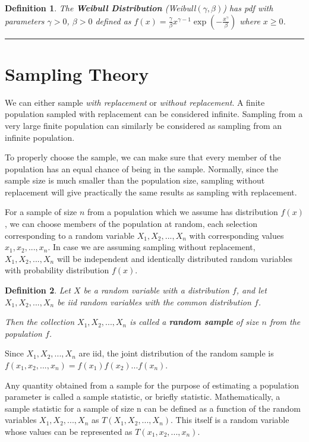 \documentclass[14pt,twoside]{extreport}
\newcommand{\hhrule}{\vspace{1cm}\hrule\vspace{1cm}}
\theoremstyle{dotless}
\newtheorem*{defn}{Definition}
\begin{document}
\begin{defn}
    The \textbf{Weibull Distribution} (Weibull$(\gamma, \beta)$) has pdf with parameters $\gamma > 0$, $\beta > 0$ defined as  $f(x) = \frac{\gamma}{\beta} x^{\gamma - 1} \exp(- \frac{x^\gamma}{\beta})$ where $x \geq 0$.
\end{defn}

\hhrule

\section*{Sampling Theory}
We can either sample \textit{with replacement} or \textit{without replacement}. A finite population sampled with replacement can be considered infinite. Sampling from a very large finite population can similarly be considered as sampling from an infinite population. 

To properly choose the sample, we can make sure that every member of the population has an equal chance of being in the sample.
Normally, since the sample size is much smaller than the population size, sampling without replacement will give practically the same results as sampling with replacement.

For a sample of size $n$ from a population which we assume has distribution $f(x)$, we can choose members of the population at random, each selection corresponding to a random variable $X_1, X_2, ..., X_n$ with corresponding values $x_1, x_2, ..., x_n$. In case we are assuming sampling without replacement, $X_1, X_2, ..., X_n$ will be independent and identically distributed random variables with probability distribution $f(x)$.

\begin{defn}
Let $X$ be a random variable with a distribution $f$, and let $X_1, X_2, ..., X_n$ be iid random variables with the common distribution $f$.

Then the collection $X_1, X_2, ..., X_n$ is called a \textbf{random sample} of size $n$ from the population $f$.
\end{defn}

Since $X_1, X_2, ..., X_n$ are iid, the joint distribution of the random sample is \\
$f(x_1, x_2, ..., x_n) = f(x_1) f(x_2) ... f(x_n)$.

Any quantity obtained from a sample for the purpose of estimating a population parameter is called a sample
statistic, or briefly statistic. Mathematically, a sample statistic for a sample of size n can be defined as a function of the random variables $X_1, X_2, ..., X_n$ as $T(X_1, X_2, ..., X_n)$. This itself is a random variable whose values can be represented as $T(x_1, x_2, ..., x_n)$.
\end{document}
